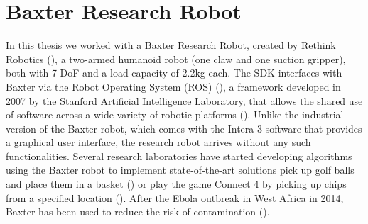 


\section{Baxter Research Robot}
In this thesis we worked with a Baxter Research Robot, created by Rethink Robotics (\cite{robotics2013baxter}),
a two-armed humanoid robot (one claw and one suction gripper), both with 7-DoF and a load capacity of 2.2kg each.
The SDK interfaces with Baxter via the Robot Operating System (ROS) (\cite{quigley2009ros}), a framework developed in 2007 by the Stanford Artificial Intelligence Laboratory, that allows the shared use of software across a wide variety of robotic platforms (\cite{fernandez2015learning}).
Unlike the industrial version of the Baxter robot, which comes with the Intera 3 software that provides a graphical user interface, the research robot arrives without any such functionalities.
Several research laboratories have started developing algorithms using the Baxter robot to implement state-of-the-art solutions \eg
pick up golf balls and place them in a basket (\cite{BaxterGolf}) or play the game Connect 4 by picking up chips from a specified location (\cite{Connect4}).
After the Ebola outbreak in West Africa in 2014, Baxter has been used to reduce the risk of contamination (\cite{Ebola}).

